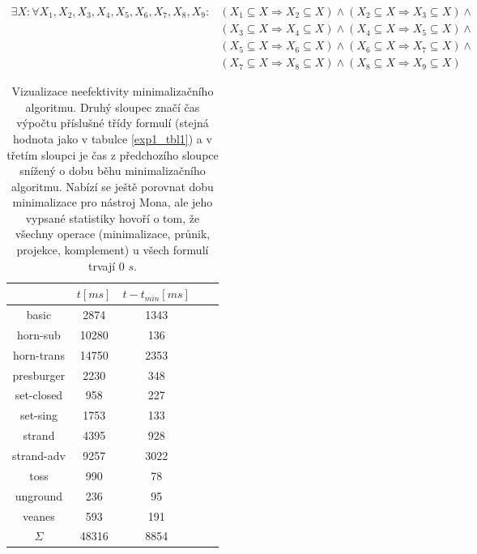 \begin{equation}
    \begin{aligned}
        \exists X : \forall X_1, X_2, X_3, X_4, X_5, X_6, X_7, X_8, X_9 : & (X_1 \subseteq X \Rightarrow X_2 \subseteq X) \wedge  (X_2 \subseteq X \Rightarrow X_3 \subseteq X) \wedge \\ & (X_3 \subseteq X \Rightarrow X_4 \subseteq X) \wedge (X_4 \subseteq X \Rightarrow X_5 \subseteq X) \wedge \\ & (X_5 \subseteq X \Rightarrow X_6 \subseteq X) \wedge (X_6 \subseteq X \Rightarrow X_7 \subseteq X) \wedge \\ & (X_7 \subseteq X \Rightarrow X_8 \subseteq X) \wedge (X_8 \subseteq X \Rightarrow X_9 \subseteq X)
    \end{aligned}
    \label{exp0_formula}
\end{equation}



\begin{table}
    \centering
    \begin{tabular}{|c||c|c|c|c|}
    \hline
         & $t[ms]$ & $t-t_{min}[ms]$ \\
        \hline\hline
        basic & 2874 & 1343 \\
        \hline
        horn-sub & 10280 & 136  \\
        \hline
        horn-trans & 14750 & 2353   \\
        \hline
        presburger & 2230 & 348  \\
        \hline
        set-closed & 958 & 227   \\
        \hline
        set-sing & 1753 & 133   \\
        \hline
        strand & 4395 & 928   \\
        \hline
        strand-adv & 9257 & 3022   \\
        \hline
        toss & 990 & 78  \\
        \hline
        unground & 236 & 95  \\
        \hline
        veanes & 593 & 191  \\
        \hline\hline
        $\Sigma$ & 48316 & 8854  \\
        \hline
    \end{tabular}
    \caption{Vizualizace neefektivity minimalizačního algoritmu. Druhý sloupec značí čas výpočtu příslušné třídy formulí (stejná hodnota jako v tabulce \ref{exp1_tbl1}) a v třetím sloupci je čas z předchozího sloupce snížený o dobu běhu minimalizačního algoritmu. Nabízí se ještě porovnat dobu minimalizace pro nástroj Mona, ale jeho vypsané statistiky hovoří o tom, že všechny operace (minimalizace, průnik, projekce, komplement) u všech formulí trvají $0$ $s$.}
    \label{exp1_tbl3}
\end{table}

